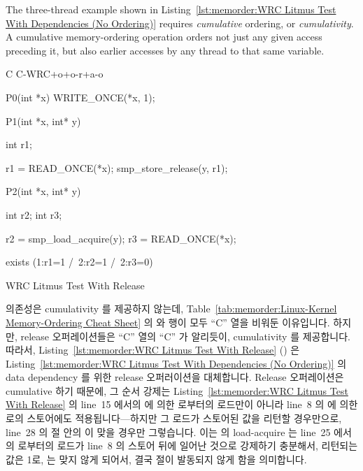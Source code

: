 The three-thread example shown in
Listing~\ref{lst:memorder:WRC Litmus Test With Dependencies (No Ordering)}
requires \emph{cumulative} ordering, or \emph{cumulativity}.
A cumulative memory-ordering operation orders not just any given
access preceding it, but also earlier accesses by any thread to that
same variable.
\fi

\begin{listing}[tbp]
{ \scriptsize
\begin{verbbox}[\LstLineNo]
C C-WRC+o+o-r+a-o

{
}

P0(int *x)
{
  WRITE_ONCE(*x, 1);
}

P1(int *x, int* y)
{
  int r1;

  r1 = READ_ONCE(*x);
  smp_store_release(y, r1);
}

P2(int *x, int* y)
{
  int r2;
  int r3;

  r2 = smp_load_acquire(y);
  r3 = READ_ONCE(*x);
}

exists (1:r1=1 /\ 2:r2=1 /\ 2:r3=0)
\end{verbbox}
}
\centering
\theverbbox
\caption{WRC Litmus Test With Release}
\label{lst:memorder:WRC Litmus Test With Release}
\end{listing}

의존성은 cumulativity 를 제공하지 않는데,
Table~\ref{tab:memorder:Linux-Kernel Memory-Ordering Cheat Sheet} 의
 와  행이 모두 ``C'' 열을 비워둔
이유입니다.
하지만, release 오퍼레이션들은 ``C'' 열의 ``C'' 가 알리듯이, cumulativity 를
제공합니다.
따라서,
Listing~\ref{lst:memorder:WRC Litmus Test With Release}
()
은
Listing~\ref{lst:memorder:WRC Litmus Test With Dependencies (No Ordering)}
의 data dependency 를 위한 release 오퍼러이션을 대체합니다.
Release 오퍼레이션은 cumulative 하기 때문에, 그 순서 강제는
Listing~\ref{lst:memorder:WRC Litmus Test With Release} 의 line~15 에서의
 에 의한  로부터의 로드만이 아니라 line~8 의  에 의한
 로의 스토어에도 적용됩니다---하지만 그 로드가 스토어된 값을 리턴할
경우만으로, line~28 의  절 안의  이 맞을 경우만
그렇습니다.
이는  의 load-acquire 는 line~25 에서의  로부터의 로드가 line~8
의 스토어 뒤에 일어난 것으로 강제하기 충분해서, 리턴되는 값은 1로, 
는 맞지 않게 되어서, 결국  절이 발동되지 않게 함을 의미합니다.
\iffalse

